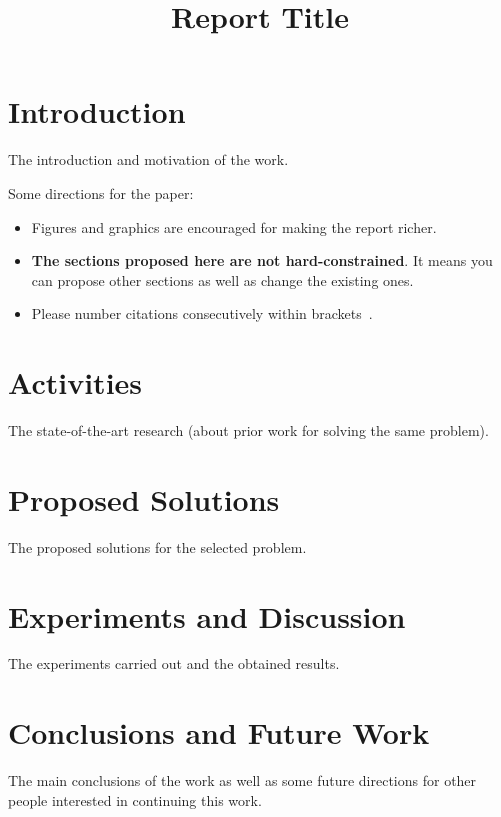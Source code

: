 \documentclass[conference]{IEEEtran}
\begin{document}
\title{Report Title}

\author{
\and
{}
}

\maketitle

\section{Introduction}

The introduction and motivation of the work.

Some directions for the paper:

\begin{itemize}
	\item Figures and graphics are encouraged for making the
	report richer.
	\item {\bf The sections proposed here are not hard-constrained}. It means you can propose other sections as well as change the existing ones.
	\item Please number citations consecutively within brackets~\cite{b1}.
\end{itemize}

\section{Activities}

The state-of-the-art research (about prior work for solving the same problem).

\section{Proposed Solutions}

The proposed solutions for the selected problem.

\section{Experiments and Discussion}

The experiments carried out and the obtained
results.

\section{Conclusions and Future Work}

The main conclusions of the work as well as some future directions for other people interested in continuing this work.



\end{document}
